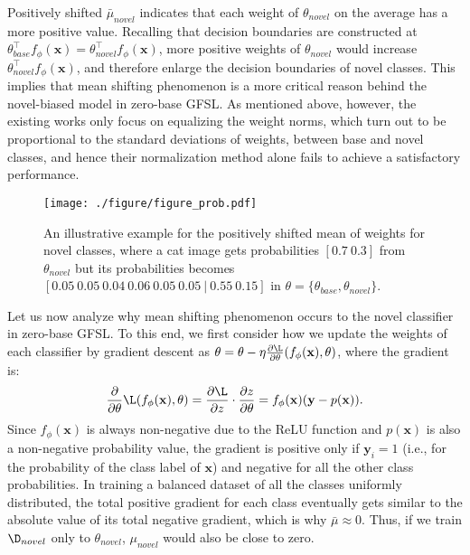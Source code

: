Positively shifted $\bar \mu_{novel}$ indicates that each weight of $\theta_{novel}$ on the average has a more positive value. Recalling that decision boundaries are constructed at $\theta_{base}^\top f_\phi(\mathbf{x}) = \theta_{novel}^\top f_\phi(\mathbf{x})$, more positive weights of $\theta_{novel}$ would increase $\theta_{novel}^\top f_\phi(\mathbf{x})$, and therefore enlarge the decision boundaries of novel classes. This implies that mean shifting phenomenon is a more critical reason behind the novel-biased model in zero-base GFSL. As mentioned above, however, the existing works \cite{HouPLWL19,KangXRYGFK20,ZhaoXGZX20} only focus on equalizing the weight norms, which turn out to be proportional to the standard deviations of weights, between base and novel classes, and hence their normalization method alone fails to achieve a satisfactory performance.


\begin{figure}[t!]
	\centering
    \texttt{[image: ./figure/figure\_prob.pdf]}
    \caption{An illustrative example for the positively shifted mean of weights for novel classes, where a cat image gets probabilities $[0.7~0.3]$ from $\theta_{novel}$ but its probabilities becomes $[0.05~0.05~0.04~0.06~0.05~0.05~|~0.55~0.15]$ in $\theta = \{\theta_{base}, \theta_{novel}\}$.}
    \label{fig:prob}\end{figure}



Let us now analyze why mean shifting phenomenon occurs to the novel classifier in zero-base GFSL. To this end, we first consider how we update the weights of each classifier by gradient descent as $\theta = \theta - \eta {\partial \L \over \partial \theta }(f_\phi(\mathbf{x}),\theta)$, where the gradient is:
\begin{equation} \label{eq:gradient}
    \begin{aligned}
{\partial  \over \partial \theta } \L (f_\phi(\mathbf{x}),\theta) = {\partial \L \over \partial z}\cdot{{\partial z \over \partial \theta}} = f_\phi(\mathbf{x}) (\mathbf{y} - p(\mathbf{x})).
    \end{aligned}
\end{equation}
Since $f_\phi(\mathbf{x})$ is always non-negative due to the ReLU function and $p(\mathbf{x})$ is also a non-negative probability value, the gradient is positive only if $\mathbf{y}_i = 1$ (i.e., for the probability of the class label of $\mathbf{x}$) and negative for all the other class probabilities. In training a balanced dataset of all the classes uniformly distributed, the total positive gradient for each class eventually gets similar to the absolute value of its total negative gradient, which is why $\bar \mu \approx 0$. Thus, if we train $\D_{novel}$ only to  $\theta_{novel}$, $\mu_{novel}$ would also be close to zero. 

